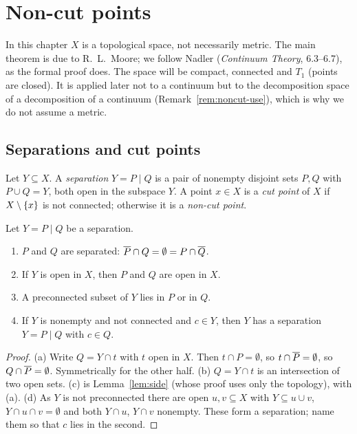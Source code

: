 \chapter{Non-cut points}\label{ch:noncut}

In this chapter $X$ is a topological space, not necessarily metric. The main theorem is due to
R.~L.~Moore; we follow Nadler (\emph{Continuum Theory}, 6.3--6.7), as the formal proof does. The
space will be compact, connected and $T_1$ (points are closed). It is applied later not to a
continuum but to the decomposition space of a decomposition of a continuum
(Remark~\ref{rem:noncut-use}), which is why we do not assume a metric.

\section{Separations and cut points}

\begin{definition}\label{def:separation}
Let $Y\subseteq X$. A \emph{separation} $Y=P\mid Q$ is a pair of nonempty disjoint sets $P,Q$ with
$P\cup Q=Y$, both open in the subspace $Y$. A point $x\in X$ is a \emph{cut point} of $X$ if
$X\setminus\left\{ x \right\}$ is not connected; otherwise it is a \emph{non-cut point}.
\end{definition}


\begin{lemma}\label{lem:sep-basic}
Let $Y=P\mid Q$ be a separation.
\begin{enumerate}[label=(\alph*)]
\item $P$ and $Q$ are separated: $\overline{P}\cap Q=\emptyset=P\cap\overline{Q}$.
\item If $Y$ is open in $X$, then $P$ and $Q$ are open in $X$.
\item A preconnected subset of $Y$ lies in $P$ or in $Q$.
\item If $Y$ is nonempty and not connected and $c\in Y$, then $Y$ has a separation $Y=P\mid Q$ with
$c\in Q$.
\end{enumerate}
\end{lemma}

\begin{proof}
(a) Write $Q=Y\cap t$ with $t$ open in $X$. Then $t\cap P=\emptyset$, so $t\cap\overline{P}=\emptyset$, so
$Q\cap\overline{P}=\emptyset$. Symmetrically for the other half.
(b) $Q=Y\cap t$ is an intersection of two open sets.
(c) is Lemma~\ref{lem:side} (whose proof uses only the topology), with (a).
(d) As $Y$ is not preconnected there are open $u,v\subseteq X$ with $Y\subseteq u\cup v$, $Y\cap u\cap
v=\emptyset$ and both $Y\cap u$, $Y\cap v$ nonempty. These form a separation; name them so that
$c$ lies in the second.
\end{proof}

